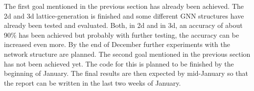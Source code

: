 The first goal mentioned in the previous section has already been achieved. 
The 2d and 3d lattice-generation is finished and some different GNN structures have already been tested and evaluated.
Both, in 2d and in 3d, an accuracy of about 90\% has been achieved but probably with further testing, the accuracy can be increased even more.
By the end of December further experiments with the network structure are planned. 
The second goal mentioned in the previous section has not been achieved yet. The code for this is planned to be finished by the beginning of January.
The final results are then expected by mid-January so that the report can be written in the last two weeks of January.  